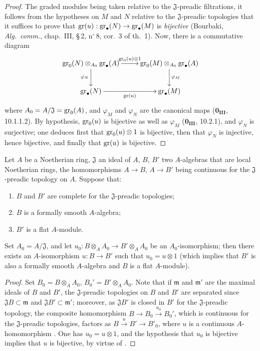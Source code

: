 \begin{proof}
The graded modules being taken relative to the $\mathfrak{J}$-preadic filtrations, it follows from the hypotheses on $M$ and $N$ relative to the $\mathfrak{J}$-preadic topologies that it suffices to prove that $\operatorname{gr}(u):\operatorname{gr}_\bullet(N)\to\operatorname{gr}_\bullet(M)$ is \emph{bijective} (Bourbaki, \emph{Alg.\ comm.}, chap.~III, \S\,2, n$^\circ$\,8, cor.~3 of th.~1).
Now, there is a commutative diagram
\[
\xymatrix{
  \gr_0(N)\otimes_{A_0}\gr_\bullet(A) \ar[r]^-{\gr_0(u)\otimes 1} \ar[d]_{\varphi_N} & \gr_0(M)\otimes_{A_0}\gr_\bullet(A) \ar[d]^{\varphi_M} \\
  \gr_\bullet(N) \ar[r]_-{\gr(u)} & \gr_\bullet(M)
}
\]
where $A_0=A/\mathfrak{J}=\operatorname{gr}_0(A)$, and $\varphi_M$ and $\varphi_N$ are the canonical maps ($\mathbf{0_{III}}$, 10.1.1.2).
By hypothesis, $\operatorname{gr}_0(u)$ is bijective as well as $\varphi_M$ ($\mathbf{0_{III}}$, 10.2.1), and $\varphi_N$ is surjective; one deduces first that $\operatorname{gr}_0(u)\otimes 1$ is bijective, then that $\varphi_N$ is injective, hence bijective, and finally that $\operatorname{gr}(u)$ is bijective.
\end{proof}

\begin{lemma}[19.7.1.5]
\label{0.19.7.1.5}
Let $A$ be a Noetherian ring, $\mathfrak{J}$ an ideal of $A$, $B$, $B'$ two $A$-algebras that are local Noetherian rings, the homomorphisms $A\to B$, $A\to B'$ being continuous for the $\mathfrak{J}$-preadic topology on $A$.
Suppose that:
\begin{enumerate}
  \item[$1^\circ$] $B$ and $B'$ are complete for the $\mathfrak{J}$-preadic topologies;
  \item[$2^\circ$] $B$ is a formally smooth $A$-algebra;
  \item[$3^\circ$] $B'$ is a flat $A$-module.
\end{enumerate}
Set $A_0=A/\mathfrak{J}$, and let $u_0:B\otimes_A A_0\to B'\otimes_A A_0$ be an $A_0$-isomorphism; then there exists an $A$-isomorphism $u:B\to B'$ such that $u_0=u\otimes 1$ (which implies that $B'$ is also a formally smooth $A$-algebra and $B$ is a flat $A$-module).
\end{lemma}

\begin{proof}
Set $B_0=B\otimes_A A_0$, $B_0'=B'\otimes_A A_0$.
Note that if $\mathfrak{m}$ and $\mathfrak{m}'$ are the maximal ideals of $B$ and $B'$, the $\mathfrak{J}$-preadic topologies on $B$ and $B'$ are separated since $\mathfrak{J}B\subset\mathfrak{m}$ and $\mathfrak{J}B'\subset\mathfrak{m}'$; moreover, as $\mathfrak{J}B'$ is closed in $B'$ for the $\mathfrak{J}$-preadic topology, the composite homomorphism $B\to B_0\xrightarrow{u_0}B_0'$, which is continuous for the $\mathfrak{J}$-preadic topologies, factors as $B\xrightarrow{u}B'\to B'_0$, where $u$ is a continuous $A$-homomorphism .
One has $u_0=u\otimes 1$, and the hypothesis that $u_0$ is bijective implies that $u$ is bijective, by virtue of .
\end{proof}


